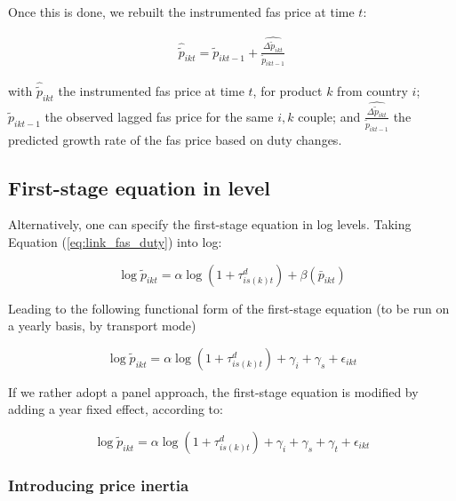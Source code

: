 \documentclass[11pt,twoside, authoryear]{elsarticle}
\begin{document}
Once this is done, we rebuilt the instrumented fas price at time $t$:

\begin{eqnarray*}
\widehat{\widetilde{p}}_{ikt} = \widetilde{p}_{ikt-1}+ \widehat{\frac{\Delta \widetilde{p}_{ikt}}{\widetilde{p}_{ikt-1}}}
\end{eqnarray*}

with $\widehat{\widetilde{p}}_{ikt}$ the instrumented fas price at time $t$, for product $k$ from country $i$; $\widetilde{p}_{ikt-1}$ the observed lagged fas price for the same $i,k$ couple; and $ \widehat{\frac{\Delta \widetilde{p}_{ikt}}{\widetilde{p}_{ikt-1}}}$ the predicted growth rate of the fas price based on duty changes.

\subsection{First-stage equation in level}

Alternatively, one can specify the first-stage equation in log levels. Taking Equation (\ref{eq:link_fas_duty}) into log:

$$\log \widetilde{p}_{ikt} =\alpha \log (1+\tau^d_{is(k)t}) + \beta \left(\bar{p}_{ikt}\right) $$

Leading to the following functional form of the first-stage equation (to be run on a yearly basis, by transport mode)

\begin{equation}
\log \widetilde{p}_{ikt} =\alpha \log (1+\tau^d_{is(k)t}) + \gamma_i +\gamma_s +\epsilon_{ikt}  \label{eq:FS_loglevel_cross_section}
\end{equation}

If we rather adopt a panel approach, the first-stage equation is modified by adding a year fixed effect, according to:

\begin{equation}
\log \widetilde{p}_{ikt} =\alpha \log (1+\tau^d_{is(k)t}) + \gamma_i +\gamma_s +\gamma_t +\epsilon_{ikt}  \label{eq:FS_loglevel_panel}
\end{equation}

\subsubsection{Introducing price inertia}
\end{document}
